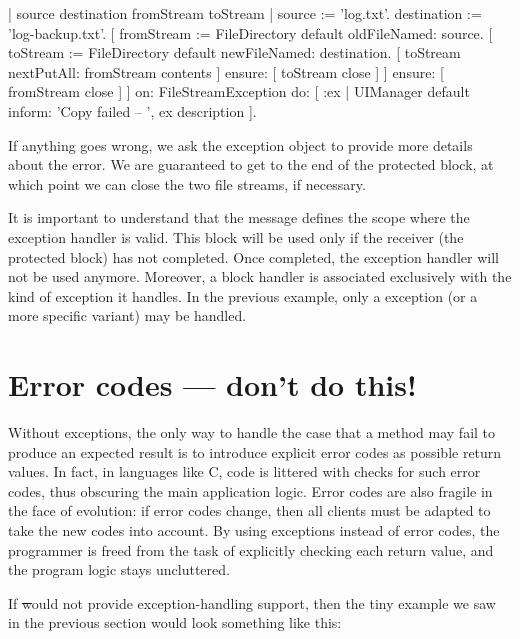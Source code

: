 \documentclass[a4paper,10pt,twoside]{book}
\begin{document}

\begin{code}{| source destination fromStream toStream |}
source := 'log.txt'.
destination := 'log-backup.txt'.
[	fromStream := FileDirectory default oldFileNamed: source.
	[	toStream := FileDirectory default newFileNamed: destination.
		[ toStream nextPutAll: fromStream contents ]
			ensure: [ toStream close ] ]
		ensure: [ fromStream close ] ]
	on: FileStreamException
	do: [ :ex | UIManager default inform: 'Copy failed -- ', ex description ].
\end{code}

If anything goes wrong, we ask the exception object to provide more details about the error.
We are guaranteed to get to the end of the protected block, at which point we can close the two file streams, if necessary.

It is important to understand  that the message  defines the scope where the exception handler is valid. This block will be used only if the receiver (\ie the protected block) has not completed. Once completed, the exception handler will not be used anymore. Moreover, a block handler is associated exclusively with the kind of exception it handles. In the previous example, only a  exception (or a more specific variant) may be handled.

\section{Error codes --- don't  do this!}

Without exceptions, the only way to handle the case that a method may fail to produce an expected result is to introduce explicit error codes as possible return values. In fact, in languages like C, code is littered with checks for such error codes, thus obscuring the main application logic.
Error codes are also fragile in the face of evolution: if error codes change, then all clients must be adapted to take the new codes into account. By using exceptions instead of error codes, the programmer is freed from the task of explicitly checking each return value, and the program logic stays uncluttered.

If \st would not provide exception-handling support, then the tiny example we saw in the previous section would look something like this:
\end{document}
